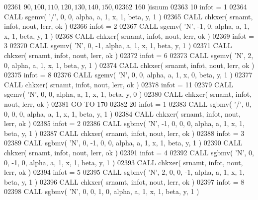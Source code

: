 \begin{DoxyCode}
02361      $        90, 100, 110, 120, 130, 140, 150,
02362      $        160 )isnum
02363    10 infot = 1
02364       \textcolor{keyword}{CALL }sgemv( \textcolor{stringliteral}{'/'}, 0, 0, alpha, a, 1, x, 1, beta, y, 1 )
02365       \textcolor{keyword}{CALL }chkxer( srnamt, infot, nout, lerr, ok )
02366       infot = 2
02367       \textcolor{keyword}{CALL }sgemv( \textcolor{stringliteral}{'N'}, -1, 0, alpha, a, 1, x, 1, beta, y, 1 )
02368       \textcolor{keyword}{CALL }chkxer( srnamt, infot, nout, lerr, ok )
02369       infot = 3
02370       \textcolor{keyword}{CALL }sgemv( \textcolor{stringliteral}{'N'}, 0, -1, alpha, a, 1, x, 1, beta, y, 1 )
02371       \textcolor{keyword}{CALL }chkxer( srnamt, infot, nout, lerr, ok )
02372       infot = 6
02373       \textcolor{keyword}{CALL }sgemv( \textcolor{stringliteral}{'N'}, 2, 0, alpha, a, 1, x, 1, beta, y, 1 )
02374       \textcolor{keyword}{CALL }chkxer( srnamt, infot, nout, lerr, ok )
02375       infot = 8
02376       \textcolor{keyword}{CALL }sgemv( \textcolor{stringliteral}{'N'}, 0, 0, alpha, a, 1, x, 0, beta, y, 1 )
02377       \textcolor{keyword}{CALL }chkxer( srnamt, infot, nout, lerr, ok )
02378       infot = 11
02379       \textcolor{keyword}{CALL }sgemv( \textcolor{stringliteral}{'N'}, 0, 0, alpha, a, 1, x, 1, beta, y, 0 )
02380       \textcolor{keyword}{CALL }chkxer( srnamt, infot, nout, lerr, ok )
02381       \textcolor{keywordflow}{GO TO} 170
02382    20 infot = 1
02383       \textcolor{keyword}{CALL }sgbmv( \textcolor{stringliteral}{'/'}, 0, 0, 0, 0, alpha, a, 1, x, 1, beta, y, 1 )
02384       \textcolor{keyword}{CALL }chkxer( srnamt, infot, nout, lerr, ok )
02385       infot = 2
02386       \textcolor{keyword}{CALL }sgbmv( \textcolor{stringliteral}{'N'}, -1, 0, 0, 0, alpha, a, 1, x, 1, beta, y, 1 )
02387       \textcolor{keyword}{CALL }chkxer( srnamt, infot, nout, lerr, ok )
02388       infot = 3
02389       \textcolor{keyword}{CALL }sgbmv( \textcolor{stringliteral}{'N'}, 0, -1, 0, 0, alpha, a, 1, x, 1, beta, y, 1 )
02390       \textcolor{keyword}{CALL }chkxer( srnamt, infot, nout, lerr, ok )
02391       infot = 4
02392       \textcolor{keyword}{CALL }sgbmv( \textcolor{stringliteral}{'N'}, 0, 0, -1, 0, alpha, a, 1, x, 1, beta, y, 1 )
02393       \textcolor{keyword}{CALL }chkxer( srnamt, infot, nout, lerr, ok )
02394       infot = 5
02395       \textcolor{keyword}{CALL }sgbmv( \textcolor{stringliteral}{'N'}, 2, 0, 0, -1, alpha, a, 1, x, 1, beta, y, 1 )
02396       \textcolor{keyword}{CALL }chkxer( srnamt, infot, nout, lerr, ok )
02397       infot = 8
02398       \textcolor{keyword}{CALL }sgbmv( \textcolor{stringliteral}{'N'}, 0, 0, 1, 0, alpha, a, 1, x, 1, beta, y, 1 )

\end{DoxyCode}
